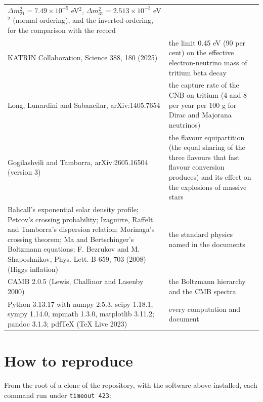 \documentclass[
  10pt,
]{article}
\begin{document}
\begin{longtable}[]{@{}
  >{\raggedright\arraybackslash}p{}
  >{\raggedright\arraybackslash}p{}@{}}
\(\Delta m^2_{21} = 7.49\times10^{-5}\) eV\(^2\),
\(\Delta m^2_{31} = 2.513\times10^{-3}\) eV\(^2\) (normal ordering), and
the inverted ordering, for the comparison with the record \\
KATRIN Collaboration, Science 388, 180 (2025) & the limit 0.45 eV (90
per cent) on the effective electron-neutrino mass of tritium beta
decay \\
Long, Lunardini and Sabancilar, arXiv:1405.7654 & the capture rate of
the CNB on tritium (4 and 8 per year per 100 g for Dirac and Majorana
neutrinos) \\
Gogilashvili and Tamborra, arXiv:2605.16504 (version 3) & the flavour
equipartition (the equal sharing of the three flavours that fast flavour
conversion produces) and its effect on the explosions of massive
stars \\
Bahcall's exponential solar density profile; Petcov's crossing
probability; Izaguirre, Raffelt and Tamborra's dispersion relation;
Morinaga's crossing theorem; Ma and Bertschinger's Boltzmann equations;
F. Bezrukov and M. Shaposhnikov, Phys. Lett. B 659, 703 (2008) (Higgs
inflation) & the standard physics named in the documents \\
CAMB 2.0.5 (Lewis, Challinor and Lasenby 2000) & the Boltzmann hierarchy
and the CMB spectra \\
Python 3.13.17 with numpy 2.5.3, scipy 1.18.1, sympy 1.14.0, mpmath
1.3.0, matplotlib 3.11.2; pandoc 3.1.3; pdfTeX (TeX Live 2023) & every
computation and document \\
\end{longtable}

\hypertarget{how-to-reproduce}{%
\section{How to reproduce}\label{how-to-reproduce}}

From the root of a clone of the repository, with the software above
installed, each command run under \texttt{timeout\ 423}:
\end{document}

